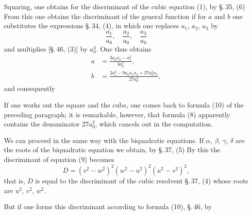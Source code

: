 
Squaring, one obtains for the discriminant of the cubic equation (1), by \S.\,35, (6)
From this one obtains the discriminant of the general function
if for $a$ and $b$ one substitutes the expressions \S.\,34, (4), in which one replaces $a_1$, $a_2$, $a_3$ by
\[
\frac{a_1}{a_0}, \quad \frac{a_2}{a_0}, \quad \frac{a_3}{a_0}
\]
and multiplies [\S.\,46, (3)] by $a_0^4$. One thus obtains
\[
\begin{aligned}
a &= \frac{3 a_0 a_2 - a_1^2}{3 a_0^2},\\
b &= \frac{2 a_1^3 - 9 a_0 a_1 a_2 + 27 a_0^2 a_3}{27 a_0^3},
\end{aligned}
\]
and consequently

If one works out the square and the cube, one comes back to formula (10) of the preceding paragraph; it is remarkable, however, that formula (8) apparently contains the denominator $27 a_0^2$, which cancels out in the computation.

We can proceed in the same way with the biquadratic equations. If $\alpha$, $\beta$, $\gamma$, $\delta$ are the roots of the biquadratic equation
we obtain, by \S.\,37, (5)
By this the discriminant of equation (9) becomes
\[
D = (v^2 - w^2)^2 (w^2 - u^2)^2 (u^2 - v^2)^2,
\]
that is, $D$ is equal to the discriminant of the cubic resolvent \S.\,37, (4)
whose roots are $u^2$, $v^2$, $w^2$.

But if one forms this discriminant according to formula (10), \S.\,46, by
